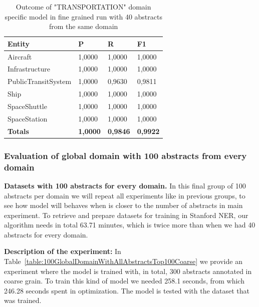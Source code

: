 \documentclass[thesis=M,english]{FITthesis}[2018/05/30]
\begin{document}
	\begin{table}[H]\centering
		\begin{tabular}{|l|l|l|l|}
			\hline {\textbf{Entity}} & {\textbf{P}} & {\textbf{R}} & {\textbf{F1}}\\\hline
				Aircraft & 1,0000 & 1,0000 & 1,0000\\
				Infrastructure & 1,0000 & 1,0000 & 1,0000\\
				PublicTransitSystem & 1,0000 & 0,9630 & 0,9811\\
				Ship & 1,0000 & 1,0000 & 1,0000\\				
				SpaceShuttle & 1,0000 & 1,0000 & 1,0000\\
				SpaceStation & 1,0000 & 1,0000 & 1,0000\\\hline
				\textbf{Totals} & \textbf{1,0000} & \textbf{0,9846} & \textbf{0,9922}\\\hline
		\end{tabular}
		\caption{Outcome of "TRANSPORTATION" domain specific model in fine grained run with 40 abstracts from the same domain \label{table:TransportationDomainWithTransportationTop40Fine}}
	\end{table}	



\subsubsection{Evaluation of global domain with 100 abstracts from every domain }

\textbf{Datasets with 100 abstracts for every domain.} In this final group of 100 abstracts per domain we will repeat all experiments like in previous groups, to see how model will behaves when is closer to the number of abstracts in main experiment. To retrieve and prepare datasets for training in Stanford NER, our algorithm needs in total 63.71 minutes, which is twice more than when we had 40 abstracts for every domain.  

	\textbf{Description of the experiment:} In Table~\ref{table:100GlobalDomainWithAllAbstractsTop100Coarse} we provide an experiment where the model is trained with, in total, 300 abstracts annotated in coarse grain. To train this kind of model we needed  258.1 seconds, from which 246.28 seconds spent in optimization. The model is tested with the dataset that was trained. 
\end{document}
